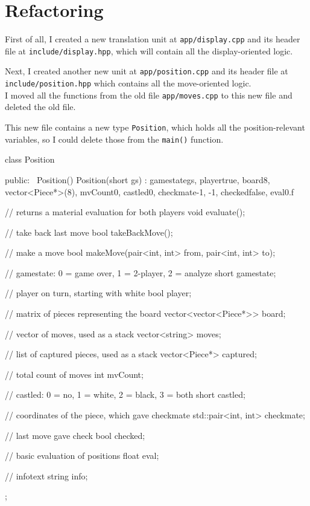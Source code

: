\section{Refactoring}

First of all, I created a new translation unit at \texttt{app/display.cpp} and its
header file at \texttt{include/display.hpp}, which will contain all the display-oriented logic.

Next, I created another new unit at \texttt{app/position.cpp} and its header file at\\
\texttt{include/position.hpp} which contains all the move-oriented logic.\\
I moved all the functions from the old file \texttt{app/moves.cpp} to this new file and
deleted the old file.

This new file contains a new type \texttt{Position}, which holds all the position-relevant variables,
so I could delete those from the \texttt{main()} function.

\begin{cpp}
class Position {
public:
  ~Position() {}
  Position(short gs) : gamestate{gs}, player{true},
               board{8, vector<Piece*>(8)},
               mvCount{0}, castled{0}, checkmate{-1, -1},
               checked{false}, eval{0.f}
  {}

  // returns a material evaluation for both players
  void evaluate();

  // take back last move
  bool takeBackMove();

  // make a move
  bool makeMove(pair<int, int> from, pair<int, int> to);

  // gamestate: 0 = game over, 1 = 2-player, 2 = analyze 
  short gamestate;

  // player on turn, starting with white
  bool player;
  
  // matrix of pieces representing the board
  vector<vector<Piece*>> board;

  // vector of moves, used as a stack
  vector<string> moves;

  // list of captured pieces, used as a stack
  vector<Piece*> captured;

  // total count of moves
  int mvCount;
  
  // castled: 0 = no, 1 = white, 2 = black, 3 = both
  short castled;
  
  // coordinates of the piece, which gave checkmate
  std::pair<int, int> checkmate;
  
  // last move gave check
  bool checked;

  // basic evaluation of positions
  float eval;

  // infotext
  string info;
};
\end{cpp}

